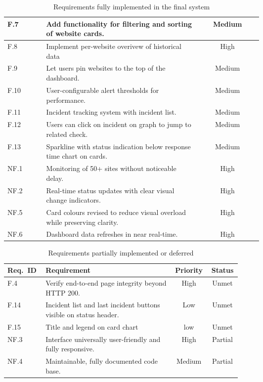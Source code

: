 {\begin{table}[H]
\begin{tabular}{|l|p{0.60\linewidth}|c|}
F.7  & Add functionality for filtering and sorting of website cards.& Medium \\ \hline
F.8  & Implement per-website overivew of historical data& High   \\ \hline
F.9  & Let users pin websites to the top of the dashboard.& Medium \\ \hline
F.10 & User-configurable alert thresholds for performance.                      & Medium \\ \hline
F.11 & Incident tracking system with incident list.                             & Medium \\ \hline
F.12 & Users can click on incident on graph to jump to related check.& Medium \\ \hline 
 F.13& Sparkline with status indication below response time chart on cards.&Medium \\\hline \hline
NF.1 & Monitoring of 50+ sites without noticeable delay.                        & High   \\ \hline
NF.2 & Real-time status updates with clear visual change indicators.            & High   \\ \hline
NF.5 & Card colours revised to reduce visual overload while preserving clarity. & High   \\ \hline
NF.6 & Dashboard data refreshes in near real-time.               & High   \\ \hline
\end{tabular}
\caption{Requirements fully implemented in the final system}
\label{tab:req_complete}
\end{table}

\begin{table}[H]
\centering
\begin{tabular}{|l|p{0.55\linewidth}|c|c|}
\hline
\textbf{Req.\ ID} & \textbf{Requirement} & \textbf{Priority} & \textbf{Status}\\ \hline
F.4  & Verify end-to-end page integrity beyond HTTP 200. & High & Unmet \\ \hline 
F.14 & Incident list and last incident buttons visible on status header.& Low&Unmet\\ \hline 
F.15 & Title and legend on card chart& low&Unmet\\\hline\hline \hline
NF.3 & Interface universally user-friendly and fully responsive. & High & Partial \\ \hline
NF.4 & Maintainable, fully documented code base. & Medium & Partial \\ \hline
\end{tabular}
\caption{Requirements partially implemented or deferred}
\label{tab:req_incomplete}
\end{table}

}
